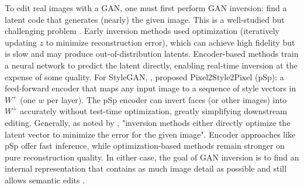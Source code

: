 To edit real images with a GAN, one must first perform GAN inversion: find a latent code that generates (nearly) the given image. 
This is a well-studied but challenging problem \cite{bobkov2024devildetailsstylefeatureeditordetailrich,richardson2021encodingstylestyleganencoder}.
Early inversion methods used optimization (iteratively updating $z$ to minimize reconstruction error), which can achieve high fidelity but is slow and may produce out-of-distribution latents. 
Encoder-based methods train a neural network to predict the latent directly, enabling real-time inversion at the expense of some quality. 
For StyleGAN, \cite{richardson2021encodingstylestyleganencoder}, proposed Pixel2Style2Pixel (pSp): 
a feed-forward encoder that maps any input image to a sequence of style vectors in $W^+$ (one $w$ per layer).
The pSp encoder can invert faces (or other images) into $W^+$ accurately without test-time optimization, greatly simplifying downstream editing.
Generally, as noted by \cite{richardson2021encodingstylestyleganencoder}, "inversion methods either directly optimize the latent vector to minimize the error for the given image".
Encoder approaches like pSp offer fast inference, while optimization-based methods remain stronger on pure reconstruction quality. In either 
case, the goal of GAN inversion is to find an internal representation that contains as much image detail as possible and still allows semantic edits \cite{bobkov2024devildetailsstylefeatureeditordetailrich}.

